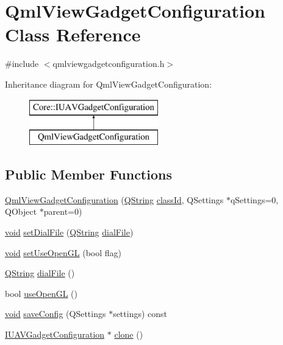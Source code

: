 \hypertarget{class_qml_view_gadget_configuration}{\section{\-Qml\-View\-Gadget\-Configuration \-Class \-Reference}
\label{class_qml_view_gadget_configuration}
}


{\ttfamily \#include $<$qmlviewgadgetconfiguration.\-h$>$}

\-Inheritance diagram for \-Qml\-View\-Gadget\-Configuration\-:\begin{figure}[H]
\begin{center}
\leavevmode
\includegraphics[height=2.000000cm]{class_qml_view_gadget_configuration}
\end{center}
\end{figure}
\subsection*{\-Public \-Member \-Functions}
\begin{DoxyCompactItemize}
\item 
\hyperlink{group___o_p_map_plugin_gac44e73d868f1af30be54bb966ffc1998}{\-Qml\-View\-Gadget\-Configuration} (\hyperlink{group___u_a_v_objects_plugin_gab9d252f49c333c94a72f97ce3105a32d}{\-Q\-String} \hyperlink{group___core_plugin_gac953657221ba7fda967ada0408332641}{class\-Id}, \-Q\-Settings $\ast$q\-Settings=0, \-Q\-Object $\ast$parent=0)
\item 
\hyperlink{group___u_a_v_objects_plugin_ga444cf2ff3f0ecbe028adce838d373f5c}{void} \hyperlink{group___o_p_map_plugin_ga3811e60e4028c59e57997daf43edc66a}{set\-Dial\-File} (\hyperlink{group___u_a_v_objects_plugin_gab9d252f49c333c94a72f97ce3105a32d}{\-Q\-String} \hyperlink{group___o_p_map_plugin_ga797d73a96488915da65e8cd79ceac1fe}{dial\-File})
\item 
\hyperlink{group___u_a_v_objects_plugin_ga444cf2ff3f0ecbe028adce838d373f5c}{void} \hyperlink{group___o_p_map_plugin_ga9613450d5753ab06673c80b0d137cbe8}{set\-Use\-Open\-G\-L} (bool flag)
\item 
\hyperlink{group___u_a_v_objects_plugin_gab9d252f49c333c94a72f97ce3105a32d}{\-Q\-String} \hyperlink{group___o_p_map_plugin_ga797d73a96488915da65e8cd79ceac1fe}{dial\-File} ()
\item 
bool \hyperlink{group___o_p_map_plugin_ga64a5c04c8b5ac9f81ebeb1e573c1d1c7}{use\-Open\-G\-L} ()
\item 
\hyperlink{group___u_a_v_objects_plugin_ga444cf2ff3f0ecbe028adce838d373f5c}{void} \hyperlink{group___o_p_map_plugin_gada9019ef4d25aa0e87788713af1d1d72}{save\-Config} (\-Q\-Settings $\ast$settings) const 
\item 
\hyperlink{group___core_plugin_gacdfdf0b1e39b5002472b76b6564ce51f}{\-I\-U\-A\-V\-Gadget\-Configuration} $\ast$ \hyperlink{group___o_p_map_plugin_gab4f87dbc27b19e319ea02819e3574853}{clone} ()
\end{DoxyCompactItemize}


